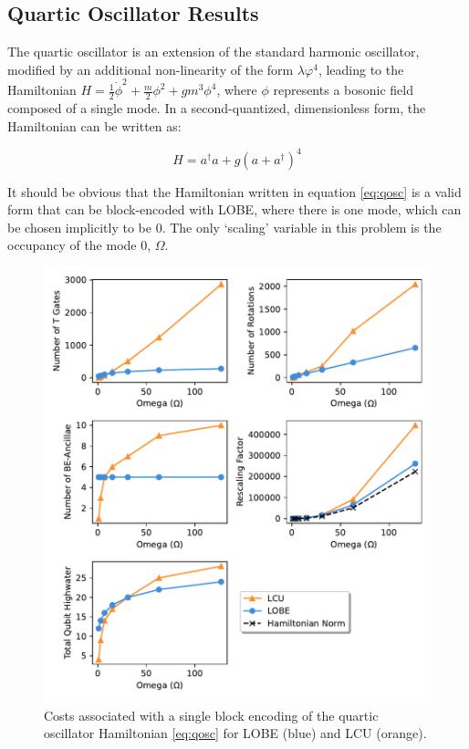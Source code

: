 \subsection{Quartic Oscillator Results}
\label{sec:qosc_results}

The quartic oscillator \cite{PhysRev.184.1231, girguś2024spiralflowquantumquartic, wójcik2012applicationnumericalrenormalizationgroup} is an extension of the standard harmonic oscillator, modified by an additional non-linearity of the form $\lambda \varphi^4$, leading to the Hamiltonian $H = \frac12\dot\phi^2 + \frac{m}{2}\phi^2 + gm^3\phi^4 $, where $\phi$ represents a bosonic field composed of a single mode.
In a second-quantized, dimensionless form, the Hamiltonian can be written as:

\begin{equation}
    \label{eq:qosc}
    H = a^\dagger a + g\left(a + a^\dagger \right)^4
\end{equation}

It should be obvious that the Hamiltonian written in equation \ref{eq:qosc} is a valid form that can be block-encoded with LOBE, where there is one mode, which can be chosen implicitly to be $0$.
The only `scaling' variable in this problem is the occupancy of the mode $0$, $\Omega$.

\begin{figure}[h]
    \centering
    \includegraphics[width = 15cm]{figures/quartic_oscillator.pdf}
    \caption{Costs associated with a single block encoding of the quartic oscillator Hamiltonian \ref{eq:qosc} for LOBE (blue) and LCU (orange).}
    \label{fig:qosc}
\end{figure}
